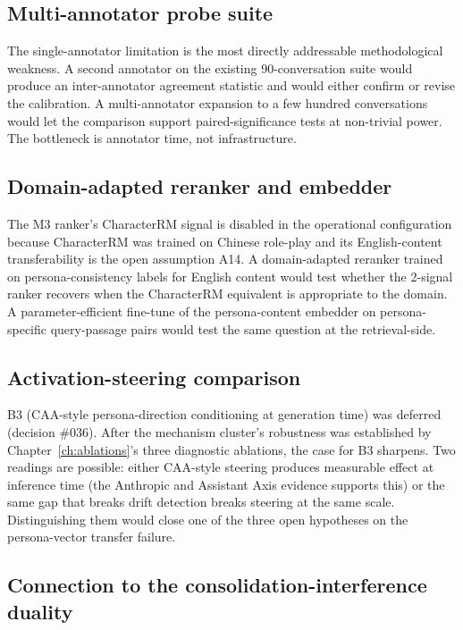 \subsection{Multi-annotator probe suite}

The single-annotator limitation is the most directly addressable methodological weakness. A second annotator on the existing 90-conversation suite would produce an inter-annotator agreement statistic and would either confirm or revise the calibration. A multi-annotator expansion to a few hundred conversations would let the comparison support paired-significance tests at non-trivial power. The bottleneck is annotator time, not infrastructure.

\subsection{Domain-adapted reranker and embedder}

The M3 ranker's CharacterRM signal is disabled in the operational configuration because CharacterRM was trained on Chinese role-play and its English-content transferability is the open assumption A14. A domain-adapted reranker trained on persona-consistency labels for English content would test whether the 2-signal ranker recovers when the CharacterRM equivalent is appropriate to the domain. A parameter-efficient fine-tune of the persona-content embedder on persona-specific query-passage pairs would test the same question at the retrieval-side.

\subsection{Activation-steering comparison}

B3 (CAA-style persona-direction conditioning at generation time) was deferred (decision \#036). After the mechanism cluster's robustness was established by Chapter~\ref{ch:ablations}'s three diagnostic ablations, the case for B3 sharpens. Two readings are possible: either CAA-style steering produces measurable effect at inference time (the Anthropic and Assistant Axis evidence supports this) or the same gap that breaks drift detection breaks steering at the same scale. Distinguishing them would close one of the three open hypotheses on the persona-vector transfer failure.

\subsection{Connection to the consolidation-interference duality}

